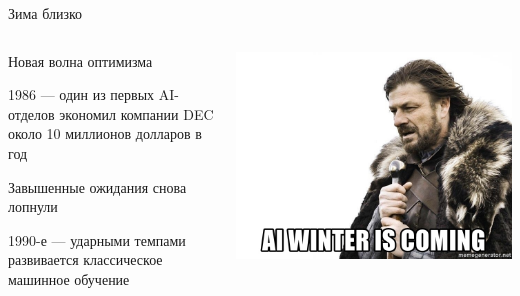 \documentclass[notes,12pt, aspectratio=169]{beamer}
\newenvironment{wideitemize}{\itemize\addtolength{\itemsep}{10pt}}{\enditemize}
\begin{document}
\begin{frame}{Зима близко}
	\begin{columns}[T]
		\begin{column}{.6\textwidth}
			\begin{wideitemize}
				\item Новая волна оптимизма

				\item 1986 — один из первых AI-отделов экономил компании DEC около 10 миллионов долларов в год

				\item Завышенные ожидания снова лопнули

				\item 1990-е — ударными темпами развивается классическое машинное обучение
			\end{wideitemize}
		\end{column}%
		\hfill%
		\begin{column}{.4\textwidth}
			\begin{center}
			\includegraphics[width=.99\linewidth]{stark.jpg}
			\end{center}
		\end{column}%
	\end{columns}
\end{frame}
\end{document}
